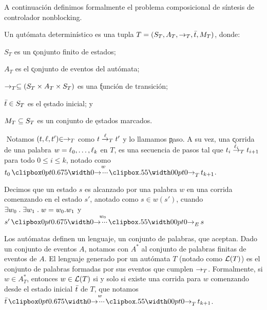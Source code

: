 A continuación definimos formalmente el problema composicional de síntesis de controlador nonblocking.

\begin{definition} \label{def:automata}
	Un \k{autómata determinístico} es una tupla $T = (S_T, A_T, \rightarrow_T, \bar{t}, M_T)$, donde:
	\begin{itemize*}[label=]
		
		\item $S_T$ es un \k{conjunto finito de estados};
		
		\item $A_T$ es el \k{conjunto de eventos} del autómata;
		
		\item $\rightarrow_T \subseteq (S_T \times A_T \times S_T)$ es una \k{función de transición};
		
		\item $\bar{t} \in S_T$ es el \k{estado inicial}; y
		
		\item $M_T \subseteq S_T$ es un conjunto de \k{estados marcados}.
		
	\end{itemize*}
	
\end{definition}

\begin{notation} \label{not:paso}
	
	$\!\!$ Notamos $(t,\ell,t') {\in}\!\! \rightarrow_T$ como $t \overset{\ell}{\rightarrow}_{T} t'$ y lo llamamos \k{paso}.
	A su vez, una \k{corrida} de una palabra $w = \ell_0,\ldots,\ell_k$ en $T$, es una secuencia de pasos tal que $t_i \overset{\ell_i}{\rightarrow}_{T} t_{i+1}$ para todo $0 \leq i \leq k$, notado como $t_0 \runw{w}{T} t_{k+1}$.
	
\end{notation}


\begin{notation}
	Decimos que un estado $s$ es alcanzado por una palabra $w$ en una corrida comenzando en el estado $s'$, anotado como $s \in w(s')$, cuando $\exists w_0 \;.\; \exists w_1 \;.\; w = w_0.w_1$ 
	y $s' \runw{w_0}{E} s$
\end{notation}

Los autómatas definen un lenguaje, un conjunto de palabras, que aceptan. Dado un conjunto de eventos $A$, notamos con $A^*$ al conjunto de palabras finitas de eventos de $A$. El lenguaje generado por un autómata $T$ (notado como $\mathcal{L}(T)$) es el conjunto de palabras formadas por sus eventos que cumplen $\rightarrow_T$. Formalmente, si $w \in A_T^*$, entonces $w \in \mathcal{L}(T)$ si y solo si existe una corrida para $w$ comenzando desde el estado inicial $\bar{t}$ de $T$, que notamos $\init{t} \runw{w}{T} t_{k+1}$.


